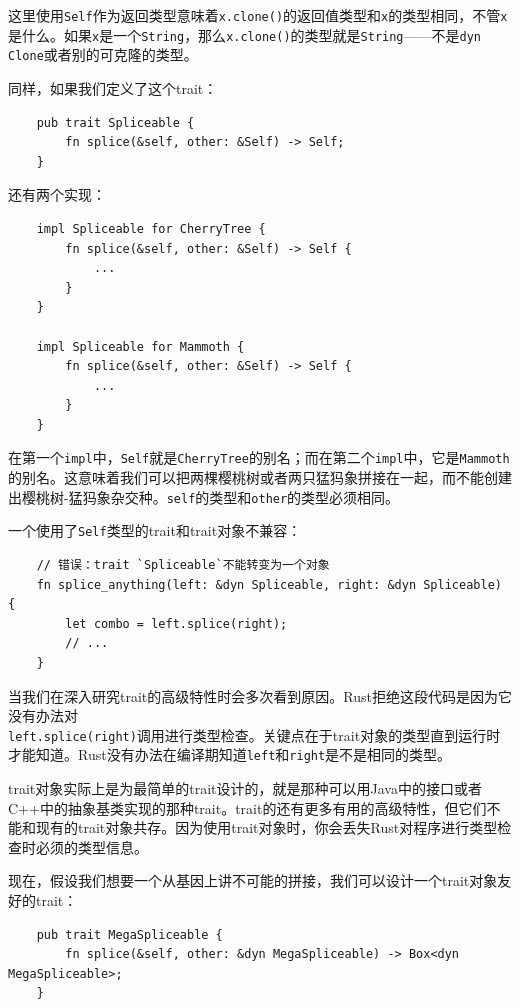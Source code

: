 这里使用\texttt{Self}作为返回类型意味着\texttt{x.clone()}的返回值类型和\texttt{x}的类型相同，不管\texttt{x}是什么。如果\texttt{x}是一个\texttt{String}，那么\texttt{x.clone()}的类型就是\texttt{String}——不是\texttt{dyn Clone}或者别的可克隆的类型。

同样，如果我们定义了这个trait：
\begin{verbatim}
    pub trait Spliceable {
        fn splice(&self, other: &Self) -> Self;
    }
\end{verbatim}
还有两个实现：
\begin{verbatim}
    impl Spliceable for CherryTree {
        fn splice(&self, other: &Self) -> Self {
            ...
        }
    }

    impl Spliceable for Mammoth {
        fn splice(&self, other: &Self) -> Self {
            ...
        }
    }    
\end{verbatim}

在第一个\texttt{impl}中，\texttt{Self}就是\texttt{CherryTree}的别名；而在第二个\texttt{impl}中，它是\texttt{Mammoth}的别名。这意味着我们可以把两棵樱桃树或者两只猛犸象拼接在一起，而不能创建出樱桃树-猛犸象杂交种。\texttt{self}的类型和\texttt{other}的类型必须相同。

一个使用了\texttt{Self}类型的trait和trait对象不兼容：
\begin{verbatim}
    // 错误：trait `Spliceable`不能转变为一个对象
    fn splice_anything(left: &dyn Spliceable, right: &dyn Spliceable) {
        let combo = left.splice(right);
        // ...
    }
\end{verbatim}

当我们在深入研究trait的高级特性时会多次看到原因。Rust拒绝这段代码是因为它没有办法对\\
\texttt{left.splice(right)}调用进行类型检查。关键点在于trait对象的类型直到运行时才能知道。Rust没有办法在编译期知道\texttt{left}和\texttt{right}是不是相同的类型。

trait对象实际上是为最简单的trait设计的，就是那种可以用Java中的接口或者C++中的抽象基类实现的那种trait。trait的还有更多有用的高级特性，但它们不能和现有的trait对象共存。因为使用trait对象时，你会丢失Rust对程序进行类型检查时必须的类型信息。

现在，假设我们想要一个从基因上讲不可能的拼接，我们可以设计一个trait对象友好的trait：
\begin{verbatim}
    pub trait MegaSpliceable {
        fn splice(&self, other: &dyn MegaSpliceable) -> Box<dyn MegaSpliceable>;
    }
\end{verbatim}

